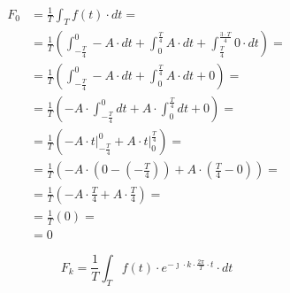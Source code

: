 \begin{task}

\begin{equation}
\begin{aligned}
F_0 &=\frac{1}{T}\int_{T}f(t) \cdot dt =\\
&=\frac{1}{T} \left( \int_{-\frac{T}{4}}^{0} -A \cdot dt + 
\int_{0}^{\frac{T}{4}} A \cdot dt +
\int_{\frac{T}{4}}^{\frac{3\cdot T}{4}} 0 \cdot dt \right ) = \\
&=\frac{1}{T} \left( \int_{-\frac{T}{4}}^{0} -A \cdot dt + 
\int_{0}^{\frac{T}{4}} A \cdot dt + 0 \right ) = \\
&=\frac{1}{T} \left( -A \cdot \int_{-\frac{T}{4}}^{0} dt + 
A \cdot \int_{0}^{\frac{T}{4}} dt + 0 \right ) = \\
&=\frac{1}{T} \left( -A \cdot \left. t \right|_{-\frac{T}{4}}^{0} + 
A \cdot \left. t \right|_{0}^{\frac{T}{4}}\right ) = \\
&=\frac{1}{T} \left( -A \cdot \left( 0 - \left(-\frac{T}{4}\right) \right) + 
A \cdot \left( \frac{T}{4} - 0 \right)\right ) = \\
&=\frac{1}{T} \left( -A \cdot \frac{T}{4} + 
A \cdot \frac{T}{4}\right ) = \\
&=\frac{1}{T} \left( 0 \right ) = \\
&=0
\end{aligned}
\end{equation}




\begin{equation}
F_k=\frac{1}{T}\int_{T}f(t) \cdot e^{-\jmath \cdot  k \cdot \frac{2\pi}{T} \cdot t} \cdot dt
\end{equation}



\end{task}

